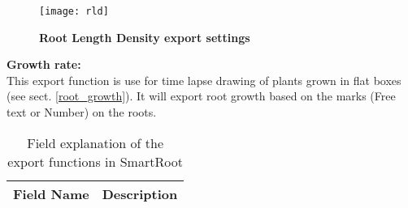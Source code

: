 \documentclass[a4paper,english,10pt]{report}
\begin{document}
\begin{figure}[htbp]
\begin{center}
\texttt{[image: rld]}
\caption[Root Length Density export settings]{\textbf{Root Length Density export settings}}
\label{rld}
\end{center}
\end{figure}

\noindent \textbf{Growth rate:\\} 
This export function is use for time lapse drawing of plants grown in flat boxes (see sect. \ref{root_growth}). It will export root growth based on the marks (Free text or Number) on the roots.\\


\begin{table}[!htdp]
\caption{Field explanation of the export functions in SmartRoot}
\begin{center}
\begin{tabular}{|lp{10cm}|}\hline 
Field Name & Description \\ \hline \hline


\end{tabular}
\end{center}
\end{table}
\end{document}
